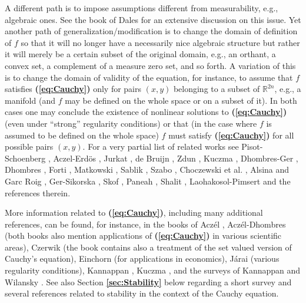 \documentclass[12 pt]{amsart}
\theoremstyle{definition}
\newcommand{\R}{\mathbb{R}}
\newcommand{\bref}[1]{\textbf{\ref{#1}}} %
\newcommand{\beqref}[1]{\textbf{(\ref{#1})}} %
\begin{document}
A different path  is to impose assumptions  different from measurability, e.g.,  algebraic ones. See the book of Dales  \cite{Dales2000book} for an extensive discussion on this issue. Yet another path of generalization/modification is to change the domain of  definition of $f$ 
so that it will no longer have a necessarily nice algebraic structure but rather 
it will merely be a certain subset of the original domain, e.g., an orthant, a convex set,  a 
complement of a measure zero set, and so forth. A variation of this is to 
change the domain of validity of the equation, for instance, to assume that $f$ satisfies \beqref{eq:Cauchy} only for pairs $(x,y)$ belonging to a subset of $\R^{2n}$, e.g., a manifold 
(and $f$ may be defined on  the whole space or on a subset of it). 
In both cases one may conclude the existence of nonlinear solutions to \beqref{eq:Cauchy} 
 (even under ``strong'' regularity conditions) or that (in the case where $f$ is assumed to be 
 defined on the whole space) $f$ must satisfy \beqref{eq:Cauchy} for all possible pairs $(x,y)$. 
  For a very partial list of related works see Pisot-Schoenberg \cite{PisotSchoenberg1964}, 
Aczel-Erd\"os \cite{AczelErdos1965}, Jurkat \cite{Jurkat1965}, de Bruijn \cite{deBruijn1966}, 
Zdun \cite{Zdun1972jour}, Kuczma \cite{Kuczma1973}, Dhombres-Ger \cite{DhombresGer1978jour}, 
Dhombres \cite{Dhombres1979}, Forti \cite{Forti1983}, Matkowski \cite{Matkowski1985},  Sablik \cite{Sablik1990}, Szabo \cite{Szabo1993}, 
Choczewski et al. \cite{CCR1994}, Alsina and Garc Roig \cite{AGR1994}, 
 Ger-Sikorska \cite{GerSikorska1997}, 
Skof \cite{Skof2004}, Paneah \cite{Paneah2004,Paneah2007}, Shalit \cite{Shalit2005,Shalit2009}, 
Laohakosol-Pimsert \cite{LaohakosolPimsert2011} 
and the references therein. 



More information related to \beqref{eq:Cauchy}, including many additional references, can  be found, for instance, in the books of Acz\'el \cite{Aczel}, Acz\'el-Dhombres \cite{AczelDhombres} (both books also mention 
 applications of \beqref{eq:Cauchy} in various scientific areas), Czerwik \cite{Czerwik2002book} (the book contains also a treatment of the set valued version of Cauchy's equation), Einchorn \cite{Einchorn1978} (for applications 
 in economics), J{\'a}rai  \cite{Jarai} (various regularity conditions), Kannappan \cite{Kannappan2009}, 
 Kuczma \cite{Kuczma2009book},  and the surveys of Kannappan \cite{Kannappan1989} and Wilansky \cite{Wilansky}. See also Section \bref{sec:Stability} below regarding a short survey and several  references related to stability in the context of the Cauchy equation. 
\end{document}
